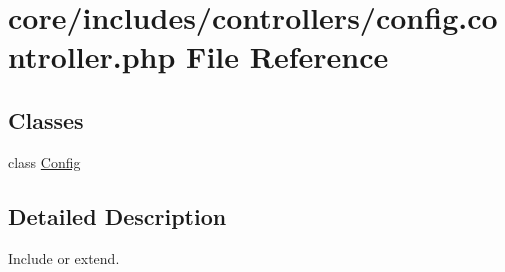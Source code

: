 \hypertarget{config_8controller_8php}{}\section{core/includes/controllers/config.controller.\+php File Reference}
\label{config_8controller_8php}
\subsection*{Classes}
\begin{DoxyCompactItemize}
\item 
class \hyperlink{classConfig}{Config}
\end{DoxyCompactItemize}


\subsection{Detailed Description}
Include or extend. 